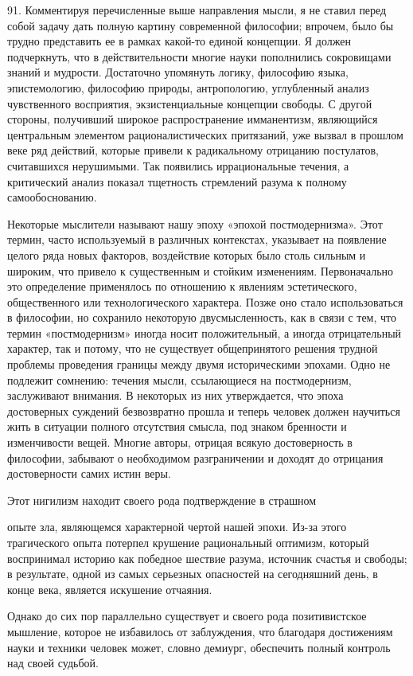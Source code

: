 \documentclass[a5paper,10pt]{article}
\begin{document}
91. Комментируя перечисленные выше направления мысли, я не ставил перед собой
задачу дать полную картину современной философии; впрочем, было бы трудно
представить ее в рамках какой-то единой концепции. Я должен подчеркнуть, что в
действительности многие науки пополнились сокровищами знаний и мудрости.
Достаточно упомянуть логику, философию языка, эпистемологию, философию природы,
антропологию, углубленный анализ чувственного восприятия, экзистенциальные
концепции свободы. С другой стороны, получивший широкое распространение
имманентизм, являющийся центральным элементом рационалистических притязаний,
уже вызвал в прошлом веке ряд действий, которые привели к радикальному
отрицанию постулатов, считавшихся нерушимыми. Так появились иррациональные
течения, а критический анализ показал тщетность стремлений разума к полному
самообоснованию.

Некоторые мыслители называют нашу эпоху «эпохой постмодернизма». Этот термин,
часто используемый в различных контекстах, указывает на появление целого ряда
новых факторов, воздействие которых было столь сильным и широким, что привело к
существенным и стойким изменениям. Первоначально это определение применялось по
отношению к явлениям эстетического, общественного или технологического
характера. Позже оно стало использоваться в философии, но сохранило некоторую
двусмысленность, как в связи с тем, что термин «постмодернизм» иногда носит
положительный, а иногда отрицательный характер, так и потому, что не существует
общепринятого решения трудной проблемы проведения границы между двумя
историческими эпохами. Одно не подлежит сомнению: течения мысли, ссылающиеся на
постмодернизм, заслуживают внимания. В некоторых из них утверждается, что эпоха
достоверных суждений безвозвратно прошла и теперь человек должен научиться жить
в ситуации полного отсутствия смысла, под знаком бренности и изменчивости
вещей. Многие авторы, отрицая всякую достоверность в философии, забывают о
необходимом разграничении и доходят до отрицания достоверности самих истин
веры.

Этот нигилизм находит своего рода подтверждение в страшном

опыте зла, являющемся характерной чертой нашей эпохи. Из-за этого трагического
опыта потерпел крушение рациональный оптимизм, который воспринимал историю как
победное шествие разума, источник счастья и свободы; в результате, одной из
самых серьезных опасностей на сегодняшний день, в конце века, является
искушение отчаяния.

Однако до сих пор параллельно существует и своего рода позитивистское мышление,
которое не избавилось от заблуждения, что благодаря достижениям науки и техники
человек может, словно демиург, обеспечить полный контроль над своей судьбой.
\end{document}
